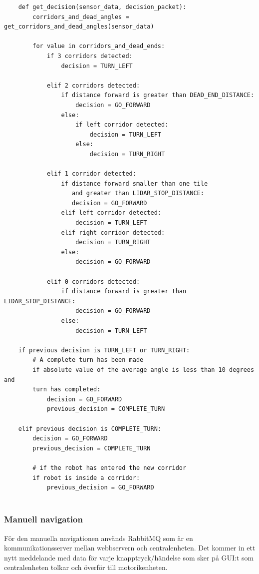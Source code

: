 \documentclass[a4paper,titlepage,12pt]{article}
\begin{document}
    \begin{lstlisting}
    def get_decision(sensor_data, decision_packet):
        corridors_and_dead_angles = get_corridors_and_dead_angles(sensor_data)

        for value in corridors_and_dead_ends:
            if 3 corridors detected:
                decision = TURN_LEFT
            
            elif 2 corridors detected:
                if distance forward is greater than DEAD_END_DISTANCE:
                    decision = GO_FORWARD
                else:
                    if left corridor detected:
                        decision = TURN_LEFT
                    else:
                        decision = TURN_RIGHT
            
            elif 1 corridor detected:
                if distance forward smaller than one tile 
                   and greater than LIDAR_STOP_DISTANCE:
                   decision = GO_FORWARD
                elif left corridor detected:
                    decision = TURN_LEFT
                elif right corridor detected:
                    decision = TURN_RIGHT
                else:
                    decision = GO_FORWARD

            elif 0 corridors detected:
                if distance forward is greater than LIDAR_STOP_DISTANCE:
                    decision = GO_FORWARD
                else:
                    decision = TURN_LEFT
    
    if previous decision is TURN_LEFT or TURN_RIGHT:
        # A complete turn has been made
        if absolute value of the average angle is less than 10 degrees and
        turn has completed:
            decision = GO_FORWARD
            previous_decision = COMPLETE_TURN

    elif previous decision is COMPLETE_TURN:
        decision = GO_FORWARD
        previous_decision = COMPLETE_TURN
        
        # if the robot has entered the new corridor
        if robot is inside a corridor:
            previous_decision = GO_FORWARD
        
    \end{lstlisting}
    
    \subsubsection{Manuell navigation}
    För den manuella navigationen används RabbitMQ som är en kommunikationsserver mellan webbservern
    och centralenheten. Det kommer in ett nytt meddelande med data för varje
    knapptryck/händelse som sker på GUI:t som centralenheten tolkar och överför
    till motorikenheten.
\end{document}
